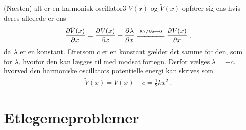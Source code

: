 \begin{opgave}{(Næsten) alt er en harmonisk oscillator}{3}
\opg $V(x)$ og $\tilde{V}(x)$ opfører sig ens hvis deres afledede er ens
\begin{align*}
	\pdif{x}{\tilde{V}(x)} = \pdif{x}{V(x)} + \pdif{x}{\lambda} \xleq{\partial\lambda/\partial x = 0} \pdif{x}{V(x)} \: ,
\end{align*}
da $\lambda$ er en konstant.
\opg Eftersom $c$ er en konstant gælder det samme for den, som for $\lambda$, hvorfor den kan lægges til med modsat fortegn. Derfor vælges $\lambda = -c$, hvorved den harmoniske oscillators potentielle energi kan skrives som
\begin{align*}
	\tilde{V}(x) = V(x) - c = \frac{1}{2}kx^2 \: .
\end{align*}
\end{opgave}
%
%
\section*{Etlegemeproblemer}
%
%
